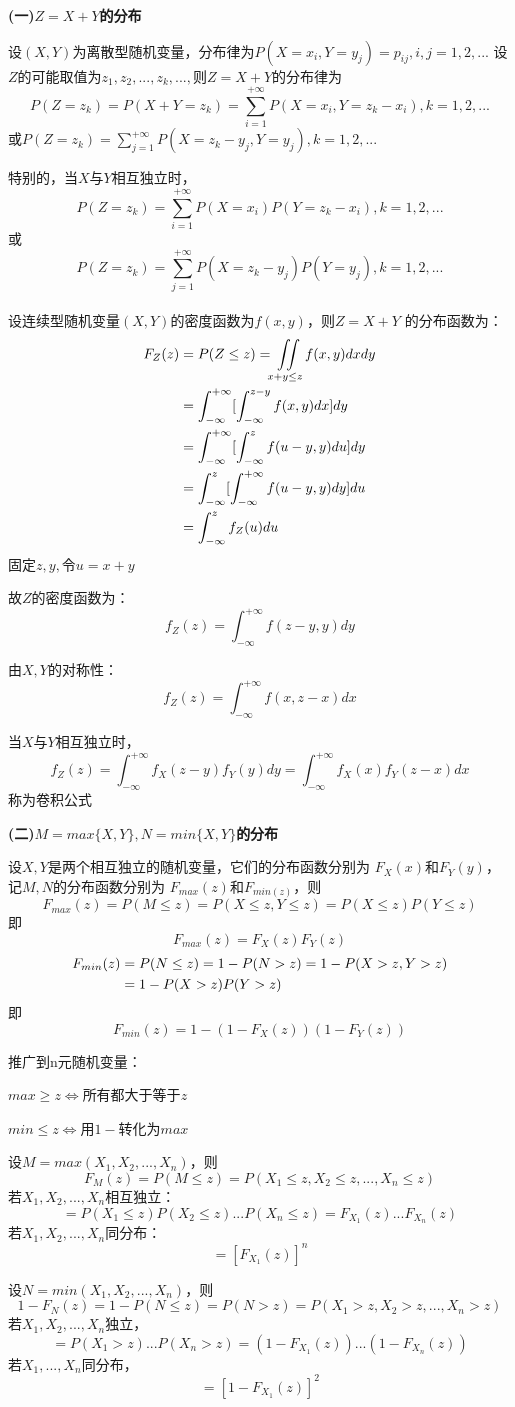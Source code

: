\begin{center}
    \textbf{(一)$Z=X+Y$的分布}
\end{center}
设$(X,Y)$为离散型随机变量，分布律为$P(X=x_i,Y=y_j)=p_{ij},i,j=1,2,...$
设$Z$的可能取值为$z_1,z_2,...,z_k,...,$则$Z=X+Y$的分布律为
$$P(Z=z_k)=P(X+Y=z_k)=\sum\limits_{i=1}^{+\infty}P(X=x_i,Y=z_k-x_i),k=1,2,...$$
或$P(Z=z_k)=\sum\limits_{j=1}^{+\infty}P(X=z_k-y_j,Y=y_j),k=1,2,...$

特别的，当$X$与$Y$相互独立时，
$$P(Z=z_k)=\sum_{i=1}^{+\infty}P(X=x_i)P(Y=z_k-x_i),k=1,2,...$$
或
$$P(Z=z_k)=\sum_{j=1}^{+\infty}P(X=z_k-y_j)P(Y=y_j),k=1,2,...$$
~\\


设连续型随机变量$(X,Y)$的密度函数为$f(x,y)$，则$Z=X+Y$
的分布函数为：
\begin{align}
    F_Z(z)&=P(Z\leq z)=\iint\limits_{x+y\leq z}f(x,y)dxdy\notag
    \\&=\int_{-\infty}^{+\infty}[\int_{-\infty}^{z-y}f(x,y)dx]dy\notag
    \\&=\int_{-\infty}^{+\infty}[\int_{-\infty}^zf(u-y,y)du]dy\notag
    \\&=\int_{-\infty}^z[\int_{-\infty}^{+\infty}f(u-y,y)dy]du\notag
    \\&=\int_{-\infty}^zf_Z(u)du\notag
\end{align}
固定$z,y,$令$u=x+y$

故$Z$的密度函数为：
$$f_Z(z)=\int_{-\infty}^{+\infty}f(z-y,y)dy$$

由$X,Y$的对称性：
$$f_Z(z)=\int_{-\infty}^{+\infty}f(x,z-x)dx$$

当$X$与$Y$相互独立时，
$$f_Z(z)=\int_{-\infty}^{+\infty}f_X(z-y)f_Y(y)dy=
\int_{-\infty}^{+\infty}f_X(x)f_Y(z-x)dx$$
称为卷积公式
\begin{center}
    \textbf{(二)$M=max\{X,Y\},N=min\{X,Y\}$的分布}
\end{center}

设$X,Y$是两个相互独立的随机变量，它们的分布函数分别为
$F_X(x)$和$F_Y(y)$，记$M,N$的分布函数分别为
$F_{max}(z)$和$F_{min(z)}$，则
$$F_{max}(z)=P(M\leq z)=P(X\leq z,Y\leq z)=P(X\leq z)P(Y\leq z)$$
即
$$F_{max}(z)=F_X(z)F_Y(z)$$
\begin{align}
    F_{min}(z)&=P(N\leq z)=1-P(N>z)=1-P(X>z,Y>z)\notag
    \\&=1-P(X>z)P(Y>z)\notag
\end{align}
即
$$F_{min}(z)=1-(1-F_X(z))(1-F_Y(z))$$

推广到n元随机变量：


$max\geq z \iff $所有都大于等于$z$

$min\leq z \iff $用$1-$转化为$max$

设$M=max(X_1,X_2,...,X_n)$，则
$$F_M(z)=P(M\leq z)=P(X_1\leq z,X_2\leq z,...,X_n\leq z)$$
若$X_1,X_2,...,X_n$相互独立：
$$=P(X_1\leq z)P(X_2\leq z)...P(X_n\leq z)=F_{X_1}(z)...F_{X_n}(z)$$
若$X_1,X_2,...,X_n$同分布：
$$=[F_{X_1}(z)]^n$$

设$N=min(X_1,X_2,...,X_n)$，则
$$1-F_N(z)=1-P(N\leq z)=P(N>z)=P(X_1>z,X_2>z,...,X_n>z)$$
若$X_1,X_2,...,X_n$独立，
$$=P(X_1>z)...P(X_n>z)=(1-F_{X_1}(z))...(1-F_{X_n}(z))$$
若$X_1,...,X_n$同分布，
$$=[1-F_{X_1}(z)]^2$$